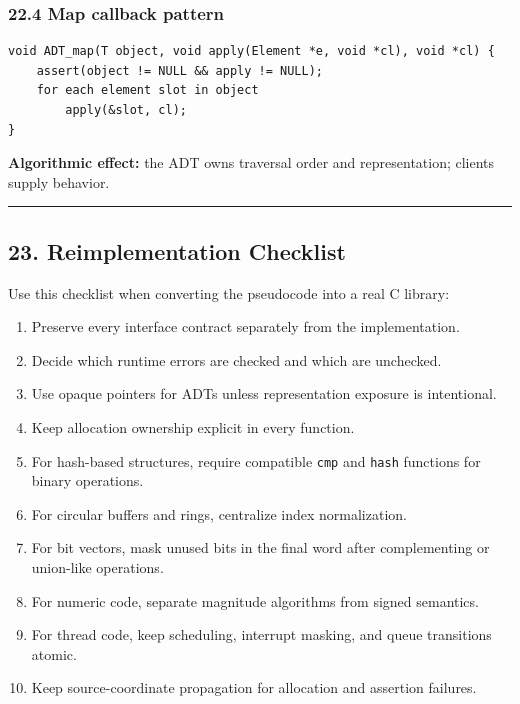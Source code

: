 \documentclass[11pt]{article}
\providecommand{\tightlist}{\setlength{\itemsep}{0pt}\setlength{\parskip}{0pt}}
\begin{document}
\subsubsection{22.4 Map callback pattern}\label{map-callback-pattern}

\begin{verbatim}
void ADT_map(T object, void apply(Element *e, void *cl), void *cl) {
    assert(object != NULL && apply != NULL);
    for each element slot in object
        apply(&slot, cl);
}
\end{verbatim}

\textbf{Algorithmic effect:} the ADT owns traversal order and representation; clients supply behavior.

\begin{center}\rule{0.5\linewidth}{0.5pt}\end{center}

\subsection{23. Reimplementation Checklist}\label{reimplementation-checklist}

Use this checklist when converting the pseudocode into a real C library:

\begin{enumerate}
\def\labelenumi{\arabic{enumi}.}
\tightlist
\item
  Preserve every interface contract separately from the implementation.
\item
  Decide which runtime errors are checked and which are unchecked.
\item
  Use opaque pointers for ADTs unless representation exposure is intentional.
\item
  Keep allocation ownership explicit in every function.
\item
  For hash-based structures, require compatible \texttt{cmp} and \texttt{hash} functions for binary operations.
\item
  For circular buffers and rings, centralize index normalization.
\item
  For bit vectors, mask unused bits in the final word after complementing or union-like operations.
\item
  For numeric code, separate magnitude algorithms from signed semantics.
\item
  For thread code, keep scheduling, interrupt masking, and queue transitions atomic.
\item
  Keep source-coordinate propagation for allocation and assertion failures.
\end{enumerate}
\end{document}
